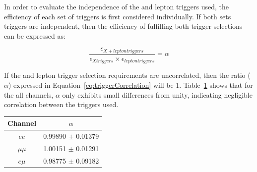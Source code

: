 In order to evaluate the independence of the \MET and lepton triggers used, the efficiency of each set of triggers is first considered individually.
If both sets triggers are independent, then the efficiency of fulfilling both trigger selections can be expressed as:

\begin{equation}
\frac{\epsilon_{X + lepton triggers}}{\epsilon_{X triggers} \times \epsilon_{lepton triggers}} = \alpha
\label{eq:triggerCorrelation}
\end{equation}

If the \MET and lepton trigger selection requirements are uncorrelated, then the ratio ($\alpha$) expressed in Equation~\ref{eq:triggerCorrelation} will be 1.
Table~\ref{tab:triggerCorrelation} shows that for the all channels, $\alpha$ only exhibits small differences from unity, indicating negligible correlation between the triggers used.

\begin{table}[htbp]
\label{tab:triggerCorrelation}
  \centering
 \begin{tabular}{cc}
   \hline
   \textbf{Channel} & \textbf{$\alpha$}   \\
   \hline   
   $ee$ & 0.99890 $\pm$ 0.01379\\
   $\mu\mu$ & 1.00151 $\pm$ 0.01291\\
   $e \mu$ & 0.98775 $\pm$ 0.09182\\
   \hline
 \end{tabular}%
\end{table}


